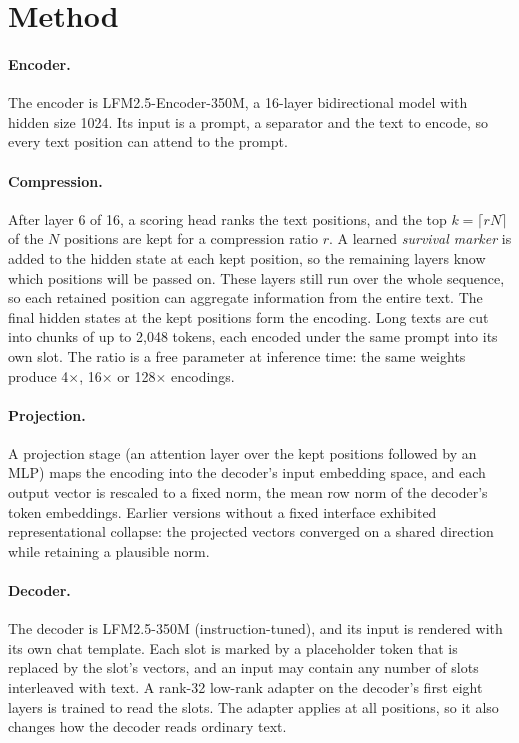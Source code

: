 \documentclass[11pt]{article}
\begin{document}
\section{Method}
\label{sec:method}

\paragraph{Encoder.}
The encoder is LFM2.5-Encoder-350M, a 16-layer bidirectional model with hidden size 1024. Its input
is a prompt, a separator and the text to encode, so every text position can attend to the prompt.

\paragraph{Compression.}
After layer 6 of 16, a scoring head ranks the text positions, and the top $k=\lceil rN\rceil$ of
the $N$ positions are kept for a compression ratio $r$. A learned \emph{survival marker} is added to
the hidden state at each kept position, so the remaining layers know which positions will be passed
on. These layers still run over the whole sequence, so each retained position can aggregate
information from the entire text. The final hidden states at the kept positions form the encoding.
Long texts are cut into chunks of up to 2{,}048 tokens, each encoded under the same prompt into its own
slot. The ratio is a free parameter at inference
time: the same weights produce 4$\times$, 16$\times$ or 128$\times$ encodings.

\paragraph{Projection.}
A projection stage (an attention layer over the kept positions followed by an MLP) maps the encoding
into the decoder's input embedding space, and each output vector is rescaled to a fixed norm, the
mean row norm of the decoder's token embeddings. Earlier versions without a fixed interface exhibited
representational collapse: the projected vectors converged on a shared direction while retaining a
plausible norm.

\paragraph{Decoder.}
The decoder is LFM2.5-350M (instruction-tuned), and its input is rendered with its own chat template.
Each slot is marked by a placeholder token that is replaced by the slot's vectors, and an input may
contain any number of slots interleaved with text. A rank-32 low-rank adapter on the decoder's first
eight layers is trained to read the slots. The adapter applies at all positions, so it also changes
how the decoder reads ordinary text.
\end{document}
